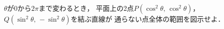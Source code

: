 \documentclass[../../main.tex]{subfiles}
\begin{document}
$\theta$が0から$2\pi$まで変わるとき，
平面上の2点$P(\cos^2\theta, \, \cos^2\theta)$，
$Q(\sin^2\theta, \, -\sin^2\theta)$を結ぶ直線が
通らない点全体の範囲を図示せよ．
\end{document}
